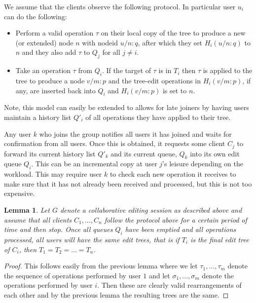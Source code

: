 \documentclass{amsart}
\newtheorem{lemma}[theorem]{Lemma}
\begin{document}
We assume that the clients observe the following protocol. 
In particular user $u_i$ can do the following:
\begin{itemize}
\item Perform a valid operation $\tau$ on their local copy of the tree to
produce a new (or extended) node $n$ with nodeid $u/n:q$,
after which they set $H_i(u/n:q)$ to $n$ and they also add $\tau$ to $Q_j$ for
all $j\ne i$.
\item Take an operation $\tau$ from $Q_i$. If the target of $\tau$ is
in $T_i$ then $\tau$ is applied to the tree to produce a node $v/m:p$
and the tree-edit operations in $H_i(v/m:p)$, if any, are inserted back into $Q_i$
 and $H_i(v/m:p)$ is set to $n$.
\end{itemize}
Note, this model can easily be extended to allows for late joiners by having users
maintain a history list $Q'_i$ of all operations they have applied to their tree. 

Any user $k$ who joins the group notifies all users it has joined and waits for confirmation from all users. Once this is obtained, it 
requests some client $C_j$ to forward its current history list $Q'_k$ and its current queue, 
$Q_k$ into its own edit queue $Q_i$.
This can be an incremental copy at user $j$'s leisure depending
on the workload.  This may require user $k$ to check each new operation
it receives to make sure that it has not already been received and processed,
but this is not too expensive.

\begin{lemma}
Let $G$ denote a collaborative editing session as described
above and assume that all clients $C_1,\ldots,C_n$ follow the protocol above
for a certain period of time and then stop. Once all queues $Q_i$ have been
emptied and all operations processed, all users will have the same edit
trees, that is if $T_i$ is the final edit tree of $C_i$, then $T_1=T_2=\ldots=T_n$.
\end{lemma}

\begin{proof}
This follows easily from the previous lemma where we let $\tau_1,\ldots,\tau_m$
denote the sequence of operations performed by user $1$ and let 
$\sigma_1,\ldots,\sigma_m$ denote the operations performed by user $i$. Then
these are clearly valid rearrangements of each other and by the previous
lemma the resulting trees are the same.
\end{proof}
\end{document}
